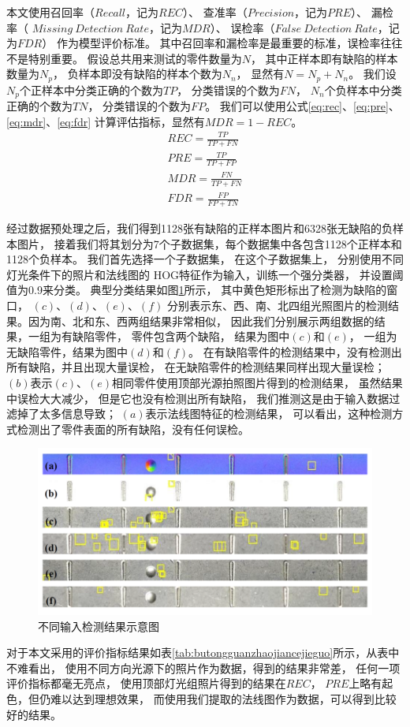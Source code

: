 本文使用召回率（$Recall$，记为$REC$）、
查准率（$Precision$，记为$PRE$）、
漏检率（ $Missing~Detection~Rate$，记为$MDR$）、
误检率（$False~Detection~Rate$，记为$FDR$）
作为模型评价标准。
其中召回率和漏检率是最重要的标准，误检率往往不是特别重要。
假设总共用来测试的零件数量为$N$，
其中正样本即有缺陷的样本数量为$N_p$，
负样本即没有缺陷的样本个数为$N_n$，
显然有$N=N_p+N_n$。
我们设$N_p$个正样本中分类正确的个数为$TP$，
分类错误的个数为$FN$，
$N_n$个负样本中分类正确的个数为$TN$，
分类错误的个数为$FP$。
我们可以使用公式\eqref{eq:rec}、\eqref{eq:pre}、\eqref{eq:mdr}、\eqref{eq:fdr}
计算评估指标，显然有$MDR=1-REC$。
\begin{gather}
REC=\frac{TP}{TP+FN}\label{eq:rec}\\
PRE=\frac{TP}{TP+FP}\label{eq:pre}\\
MDR=\frac{FN}{TP+FN}\label{eq:mdr}\\
FDR=\frac{FP}{FP+TN}\label{eq:fdr}
\end{gather}

经过数据预处理之后，我们得到1128张有缺陷的正样本图片和6328张无缺陷的负样本图片，
接着我们将其划分为7个子数据集，每个数据集中各包含1128个正样本和1128个负样本。
我们首先选择一个子数据集，
在这个子数据集上，
分别使用不同灯光条件下的照片和法线图的
HOG特征作为输入，训练一个强分类器，
并设置阈值为0.9来分类。
典型分类结果如图\ref{fig:chuantongjiancejieguo}所示，
其中黄色矩形标出了检测为缺陷的窗口，
$(c)$、$(d)$、$(e)$、$(f)$
分别表示东、西、南、北四组光照图片的检测结果。因为南、北和东、西两组结果非常相似，
因此我们分别展示两组数据的结果，一组为有缺陷零件，
零件包含两个缺陷，
结果为图中$(c)$和$(e)$，
一组为无缺陷零件，结果为图中$(d)$和$(f)$。
在有缺陷零件的检测结果中，没有检测出所有缺陷，并且出现大量误检，
在无缺陷零件的检测结果同样出现大量误检；
$(b)$表示$(c)$、$(e)$相同零件使用顶部光源拍照图片得到的检测结果，
虽然结果中误检大大减少，
但是它也没有检测出所有缺陷，
我们推测这是由于输入数据过滤掉了太多信息导致；
$(a)$表示法线图特征的检测结果，
可以看出，这种检测方式检测出了零件表面的所有缺陷，没有任何误检。
\begin{figure}[htbp]
\centering
\includegraphics[width=1.0\linewidth]{figures/chuantongjiancejieguo.png}
\caption{不同输入检测结果示意图}
\label{fig:chuantongjiancejieguo}
\end{figure}
对于本文采用的评价指标结果如表\ref{tab:butongguanzhaojiancejieguo}所示，从表中不难看出，
使用不同方向光源下的照片作为数据，得到的结果非常差，
任何一项评价指标都毫无亮点，
使用顶部灯光组照片得到的结果在$REC$，
$PRE$上略有起色，但仍难以达到理想效果，
而使用我们提取的法线图作为数据，可以得到比较好的结果。

